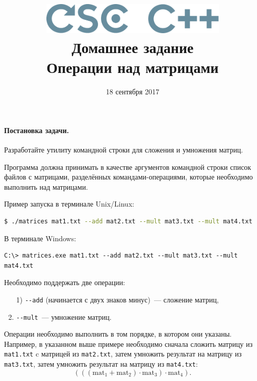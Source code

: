 \documentclass[a4paper,10pt]{article}
\begin{document}

\lstset{
  basicstyle=\ttfamily,
  columns=fullflexible
}

\title{\includegraphics[height=15mm]{../CSCCPP}\\[1em]
Домашнее задание  \\ Операции над матрицами}
\preauthor{}
\author{}
\postauthor{}
\date{18 сентября 2017}

\maketitle

\paragraph{Постановка задачи.}
Разработайте утилиту командной строки для сложения и умножения матриц.

Программа должна принимать в качестве аргументов командной строки список файлов с матрицами, разделённых командами-операциями, которые необходимо выполнить над матрицами.

Пример запуска в терминале Unix/Linux:

\begin{lstlisting}[language=bash, frame=single]
$ ./matrices mat1.txt --add mat2.txt --mult mat3.txt --mult mat4.txt
\end{lstlisting}

В терминале Windows:

\begin{lstlisting}[language=command.com, frame=single]
C:\> matrices.exe mat1.txt --add mat2.txt --mult mat3.txt --mult mat4.txt
\end{lstlisting}

Необходимо поддержать две операции:
\begin{enumerate}
  \item[1)] \lstinline[language=bash]`--add` (начинается с двух знаков минус)~--- сложение матриц,
  \item[2)] \lstinline[language=bash]`--mult`~--- умножение матриц.
\end{enumerate}

Операции необходимо выполнить в том порядке, в котором они указаны.
Например, в указанном выше примере необходимо сначала сложить матрицу из \texttt{mat1.txt} c матрицей из \texttt{mat2.txt},
затем умножить результат на матрицу из \texttt{mat3.txt},
затем умножить результат на матрицу из \texttt{mat4.txt}:
$$
  (((\mathrm{mat}_1 + \mathrm{mat}_2) \cdot \mathrm{mat}_3) \cdot \mathrm{mat}_4).
$$
\end{document}

